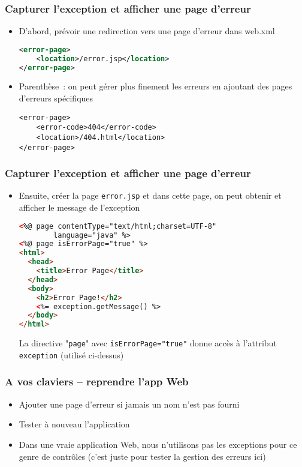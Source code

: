 \documentclass{beamer}
\begin{document}
\begin{frame}[fragile]
	\frametitle{Capturer l'exception et afficher une page d'erreur}
	\begin{itemize}
		\item D'abord, prévoir une redirection vers une page d'erreur dans web.xml
		\begin{lstlisting}[language=XML]
<error-page>
	<location>/error.jsp</location>
</error-page>		
		\end{lstlisting}
	\item Parenthèse~: on peut gérer plus finement les erreurs en ajoutant des pages d'erreurs spécifiques
\begin{lstlisting}
<error-page>
	<error-code>404</error-code>
	<location>/404.html</location>
</error-page>
\end{lstlisting}
	\end{itemize}
\end{frame}

\begin{frame}[fragile]
	\frametitle{Capturer l'exception et afficher une page d'erreur}
	\begin{itemize}
		\item Ensuite, créer la page \texttt{error.jsp} et dans cette page, on peut obtenir et afficher le message de l'exception
		\begin{lstlisting}[language=HTML]
<%@ page contentType="text/html;charset=UTF-8" 
 		language="java" %>
<%@ page isErrorPage="true" %>
<html>
  <head>
    <title>Error Page</title>
  </head>
  <body>
    <h2>Error Page!</h2>
	<%= exception.getMessage() %>
  </body>
</html>	
		\end{lstlisting}
		La directive "\texttt{page}" avec \texttt{isErrorPage="true"} donne accès à l'attribut \texttt{exception} (utilisé ci-dessus)
	\end{itemize}
\end{frame}

\begin{frame}
	\frametitle{A vos claviers -- reprendre l'app Web}
	\begin{itemize}
		\item Ajouter une page d'erreur si jamais un nom n'est pas fourni
		\item Tester à nouveau l'application
		\item Dans une vraie application Web, nous n'utilisons pas les exceptions pour ce genre de contrôles (c'est juste pour tester la gestion des erreurs ici)
	\end{itemize}
\end{frame}
\end{document}
